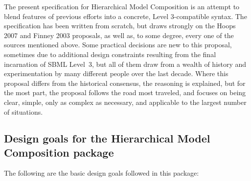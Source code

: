 The present specification for Hierarchical Model Composition is an
attempt to blend features of previous efforts into a concrete, Level
3-compatible syntax.  The specification has been written from scratch,
but draws strongly on the Hoops 2007 and Finney 2003 proposals, as well
as, to some degree, every one of the sources mentioned above.  Some
practical decisions are new to this proposal, sometimes due to
additional design constraints resulting from the final incarnation of
SBML Level~3, but all of them draw from a wealth of history and
experimentation by many different people over the last decade.  Where
this proposal differs from the historical consensus, the reasoning is
explained, but for the most part, the proposal follows the road most
traveled, and focuses on being clear, simple, only as complex as
necessary, and applicable to the largest number of situations.


\subsection{Design goals for the Hierarchical Model Composition package}
\label{sec:design-goals}

The following are the basic design goals followed in this package:


